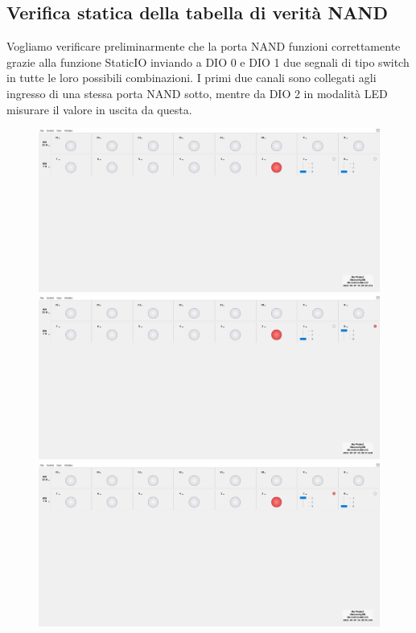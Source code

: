 \documentclass[10pt, a4paper, italian]{article}
\begin{document}
\subsection{Verifica statica della tabella di verità NAND}
Vogliamo verificare preliminarmente che la porta NAND funzioni correttamente
grazie alla funzione StaticIO inviando a DIO 0 e DIO 1 due segnali di tipo
switch in tutte le loro possibili combinazioni. I primi due canali sono
collegati agli ingresso di una stessa porta NAND sotto, mentre da DIO 2 in
modalità LED misurare il valore in uscita da questa.
\begin{figure}[htbp]
	\includegraphics[scale=0.21]{static_nand00}
	\includegraphics[scale=0.21]{static_nand01}
	\includegraphics[scale=0.21]{static_nand10}

\end{figure}
\end{document}
